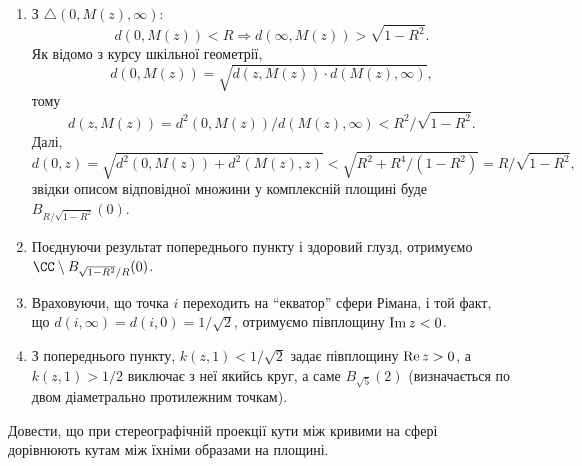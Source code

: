 \begin{solution}
    \begin{enumerate}
        \item З $\triangle(0, M(z), \infty)$: 
        \[ d(0, M(z)) < R \Rightarrow d(\infty, M(z)) > \sqrt {1 - R^2}.\]
        Як відомо з курсу шкільної геометрії, 
        \[ d(0, M(z)) = \sqrt{d(z, M(z)) \cdot d(M(z), \infty)}, \]
        тому 
        \[ d(z, M(z)) = d^2(0, M(z)) / d(M(z), \infty) < R^2 / \sqrt{1 - R^2}. \]
        Далі,
        \[ d(0, z) = \sqrt{d^2(0, M(z)) + d^2(M(z), z)} < \sqrt{R^2 + R^4 / (1 - R^2)} = R / \sqrt{1 - R^2}, \]
        звідки описом відповідної множини у комплексній площині буде $B_{R / \sqrt{1 - R^2}}(0)$.
        \item
        Поєднуючи результат попереднього пункту і здоровий глузд, отримуємо $\CC \setminus B_{\sqrt{1 - R^2}/R}(0)$.
        \item Враховуючи, що точка $i$ переходить на ``екватор'' сфери Рімана, і той факт, що $d(i, \infty) = d(i, 0) = 1 / \sqrt{2}$, отримуємо півплощину $\operatorname{Im} z < 0$.
        \item З попереднього пункту, $k(z, 1) < 1 / \sqrt 2$ задає півплощину $\operatorname{Re} z > 0$, а $k(z, 1) > 1 / 2$ виключає з неї якийсь круг, а саме $B_{\sqrt 5}(2)$ (визначається по двом діаметрально протилежним точкам).
    \end{enumerate}
\end{solution}

\begin{problem}[1.55, Волковиський]
    Довести, що при стереографічній проекції кути між кривими на сфері дорівнюють кутам між їхніми образами на площині.
\end{problem}

